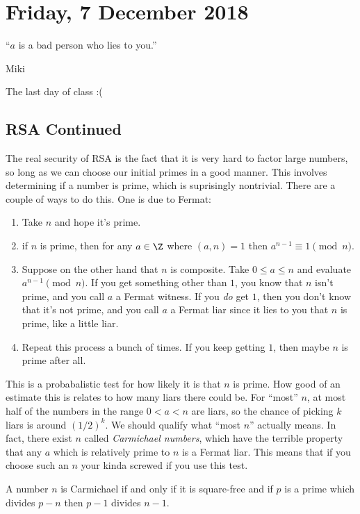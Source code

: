 \section{Friday, 7 December 2018}

\epigraph{``$a$ is a bad person who lies to you.''}{Miki}

The last day of class :(

\subsection{RSA Continued}

The real security of RSA is the fact that it is very hard to factor large numbers, so long as we can choose our initial primes in a good manner. This involves determining if a number is prime, which is suprisingly nontrivial. There are a couple of ways to do this. One is due to Fermat:
\begin{enumerate}
\item Take $n$ and hope it's prime.
\item if $n$ is prime, then for any $a \in \Z$ where $(a,n) = 1$ then $a^{n-1} \equiv 1 \pmod{n}$.
\item Suppose on the other hand that $n$ is composite. Take $0 \leq a \leq n$ and evaluate $a^{n-1} \pmod{n}$. If you get something other than $1$, you know that $n$ isn't prime, and you call $a$ a Fermat witness. If you \emph{do} get $1$, then you don't know that it's not prime, and you call $a$ a Fermat liar since it lies to you that $n$ is prime, like a little liar.
\item Repeat this process a bunch of times. If you keep getting $1$, then maybe $n$ is prime after all.
\end{enumerate}
This is a probabalistic test for how likely it is that $n$ is prime. How good of an estimate this is relates to how many liars there could be. For ``most'' $n$, at most half of the numbers in the range $0 < a < n$ are liars, so the chance of picking $k$ liars is around $(1/2)^k$. We should qualify what ``most $n$'' actually means. In fact, there exist $n$ called \emph{Carmichael numbers}, which have the terrible property that any $a$ which is relatively prime to $n$ is a Fermat liar. This means that if you choose such an $n$ your kinda screwed if you use this test.

\begin{theorem}
A number $n$ is Carmichael if and only if it is square-free and if $p$ is a prime which divides $p-n$ then $p-1$ divides $n-1$.
\end{theorem}

